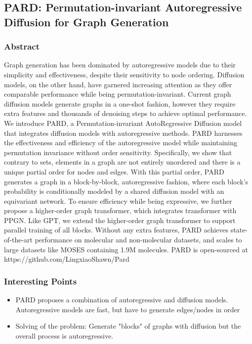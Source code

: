 
\subsection{PARD: Permutation-invariant Autoregressive Diffusion
for Graph Generation}
\subsubsection{Abstract}
Graph generation has been dominated by autoregressive models due to their simplicity and effectiveness, despite their sensitivity to node ordering. Diffusion
models, on the other hand, have garnered increasing attention as they offer comparable performance while being permutation-invariant. Current graph diffusion
models generate graphs in a one-shot fashion, however they require extra features
and thousands of denoising steps to achieve optimal performance. We introduce
PARD, a Permutation-invariant AutoRegressive Diffusion model that integrates
diffusion models with autoregressive methods. PARD harnesses the effectiveness and efficiency of the autoregressive model while maintaining permutation
invariance without order sensitivity. Specifically, we show that contrary to sets,
elements in a graph are not entirely unordered and there is a unique partial order for nodes and edges. With this partial order, PARD generates a graph in a
block-by-block, autoregressive fashion, where each block’s probability is conditionally modeled by a shared diffusion model with an equivariant network. To
ensure efficiency while being expressive, we further propose a higher-order graph
transformer, which integrates transformer with PPGN. Like GPT, we extend the
higher-order graph transformer to support parallel training of all blocks. Without
any extra features, PARD achieves state-of-the-art performance on molecular and
non-molecular datasets, and scales to large datasets like MOSES containing 1.9M
molecules. PARD is open-sourced at https://github.com/LingxiaoShawn/Pard
\subsubsection{Interesting Points}
\begin{itemize}
    \item PARD proposes a combination of autoregressive and diffusion models. Autoregressive models are fast, but have to generate edges/nodes in order
    \item Solving of the problem: Generate "blocks" of graphs with diffusion but the overall process is autoregressive.
\end{itemize}